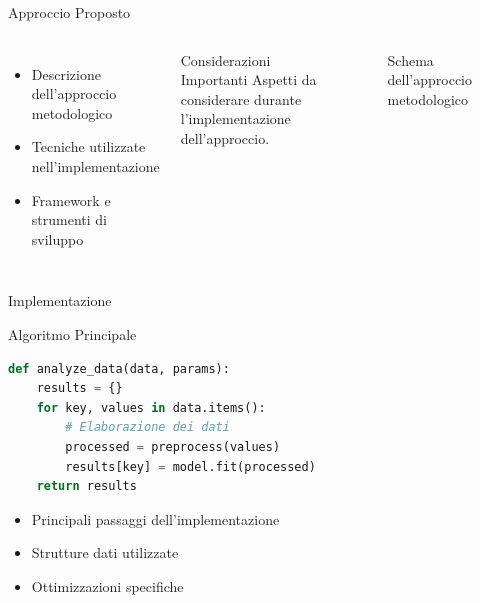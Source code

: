 \documentclass[aspectratio=169,11pt]{beamer}
\begin{document}
\begin{frame}{Approccio Proposto}
  \begin{columns}[T]
    \begin{itemize}
      \item Descrizione dell'approccio metodologico
      \item Tecniche utilizzate nell'implementazione
      \item Framework e strumenti di sviluppo
    \end{itemize}
    
    \begin{alertblock}{Considerazioni Importanti}
      Aspetti da considerare durante l'implementazione dell'approccio.
    \end{alertblock}
    
    \begin{figure}
      \centering
      \caption{Schema dell'approccio metodologico}
    \end{figure}
  \end{columns}
\end{frame}

\begin{frame}[fragile]{Implementazione}
  \begin{block}{Algoritmo Principale}
    \begin{lstlisting}[language=Python, basicstyle=\small\ttfamily]
def analyze_data(data, params):
    results = {}
    for key, values in data.items():
        # Elaborazione dei dati
        processed = preprocess(values)
        results[key] = model.fit(processed)
    return results
    \end{lstlisting}
  \end{block}
  
  \begin{itemize}
    \item Principali passaggi dell'implementazione
    \item Strutture dati utilizzate
    \item Ottimizzazioni specifiche
  \end{itemize}
\end{frame}
\end{document}
